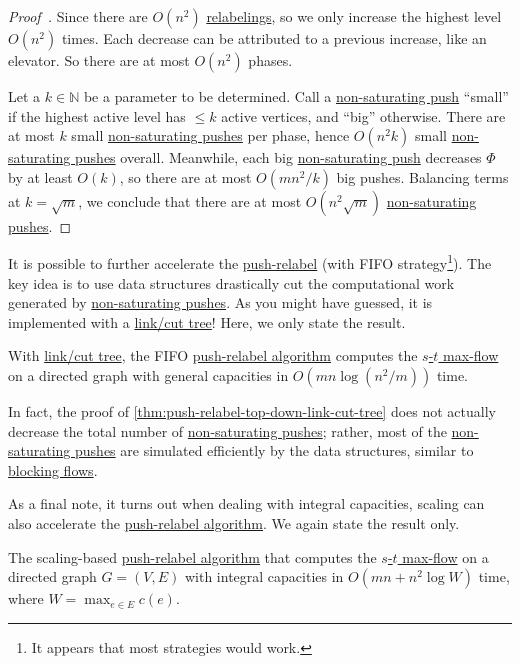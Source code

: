 \begin{proof}[Proof~\cite{cheriyan1999analysis}]
	Since there are \(O(n^2)\) \hyperref[algo:push-relabel-relabel]{relabelings}, so we only increase the highest level \(O(n^2)\) times. Each decrease can be attributed to a previous increase, like an elevator. So there are at most \(O(n^2)\) phases.

	Let a \(k \in \mathbb{N} \) be a parameter to be determined. Call a \hyperref[algo:push-relabel-push-non-saturating]{non-saturating push} ``small'' if the highest active level has \(\leq k\) active vertices, and ``big'' otherwise. There are at most \(k\) small \hyperref[algo:push-relabel-push-non-saturating]{non-saturating pushes} per phase, hence \(O(n^2 k)\) small \hyperref[algo:push-relabel-push-non-saturating]{non-saturating pushes} overall. Meanwhile, each big \hyperref[algo:push-relabel-push-non-saturating]{non-saturating push} decreases \(\Phi \) by at least \(O(k)\), so there are at most \(O(mn^2 / k)\) big pushes. Balancing terms at \(k = \sqrt{m} \), we conclude that there are at most \(O(n^2 \sqrt{m} )\) \hyperref[algo:push-relabel-push-non-saturating]{non-saturating pushes}.
\end{proof}

It is possible to further accelerate the \hyperref[algo:push-relabel]{push-relabel} (with FIFO strategy\footnote{It appears that most strategies would work.}). The key idea is to use data structures drastically cut the computational work generated by \hyperref[algo:push-relabel-push-non-saturating]{non-saturating pushes}. As you might have guessed, it is implemented with a \hyperref[def:link-cut-tree]{link/cut tree}! Here, we only state the result.

\begin{theorem}\label{thm:push-relabel-top-down-link-cut-tree}
	With \hyperref[def:link-cut-tree]{link/cut tree}, the FIFO \hyperref[algo:push-relabel]{push-relabel algorithm} computes the \hyperref[prb:s-t-max-flow]{\(s\)-\(t\) max-flow} on a directed graph with general capacities in \(O(mn \log (n^2 / m))\) time.
\end{theorem}

\begin{note}
	In fact, the proof of \autoref{thm:push-relabel-top-down-link-cut-tree} does not actually decrease the total number of \hyperref[algo:push-relabel-push-non-saturating]{non-saturating pushes}; rather, most of the \hyperref[algo:push-relabel-push-non-saturating]{non-saturating pushes} are simulated efficiently by the data structures, similar to \hyperref[def:blocking-flow]{blocking flows}.
\end{note}

As a final note, it turns out when dealing with integral capacities, scaling can also accelerate the \hyperref[algo:push-relabel]{push-relabel algorithm}. We again state the result only.

\begin{theorem}
	The scaling-based \hyperref[algo:push-relabel]{push-relabel algorithm} that computes the \hyperref[prb:s-t-max-flow]{\(s\)-\(t\) max-flow} on a directed graph \(G = (V, E)\) with integral capacities in \(O(mn + n^2 \log W)\) time, where \(W = \max _{e \in E} c(e)\).
\end{theorem}